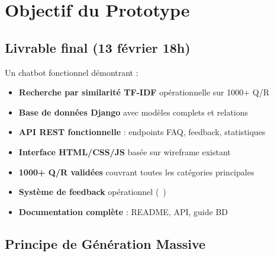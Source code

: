 \documentclass[11pt,a4paper]{article}
\begin{document}
\section{Objectif du Prototype}
\label{sec:objectif}

\subsection{Livrable final (13 février 18h)}

Un chatbot fonctionnel démontrant :

\begin{itemize}
    \item[\faIcon{check}] \textbf{Recherche par similarité TF-IDF} opérationnelle sur 1000+ Q/R
    \item[\faIcon{check}] \textbf{Base de données Django} avec modèles complets et relations
    \item[\faIcon{check}] \textbf{API REST fonctionnelle} : endpoints FAQ, feedback, statistiques
    \item[\faIcon{check}] \textbf{Interface HTML/CSS/JS} basée sur wireframe existant
    \item[\faIcon{check}] \textbf{1000+ Q/R validées} couvrant toutes les catégories principales
    \item[\faIcon{check}] \textbf{Système de feedback} opérationnel (\faThumbsUp \, \faThumbsDown)
    \item[\faIcon{check}] \textbf{Documentation complète} : README, API, guide BD
\end{itemize}

\subsection{Principe de Génération Massive}
\end{document}
